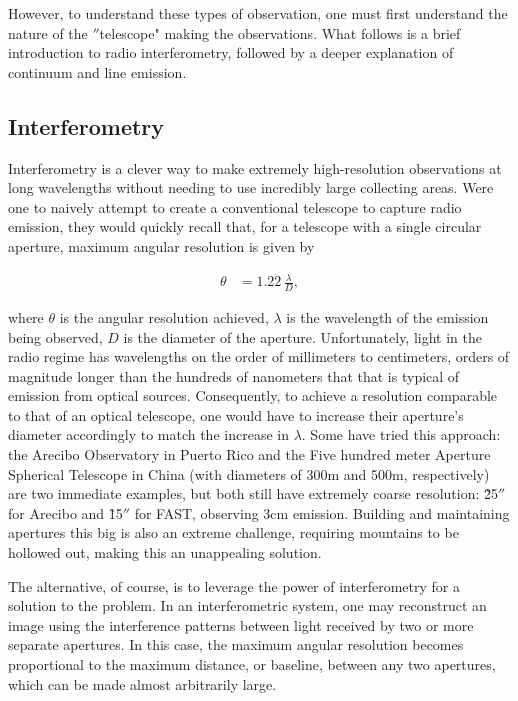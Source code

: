 However, to understand these types of observation, one must first understand the nature of the $''$telescope" making the observations. What follows is a brief introduction to radio interferometry, followed by a deeper explanation of continuum and line emission.



\subsection{Interferometry}
\label{section: interferometry}
Interferometry is a clever way to make extremely high-resolution observations at long wavelengths without needing to use incredibly large collecting areas. Were one to naively attempt to create a conventional telescope to capture radio emission, they would quickly recall that, for a telescope with a single circular aperture, maximum angular resolution is given by

\begin{align}
  \theta &= 1.22 \, \frac{\lambda}{D},
\end{align}

\noindent where $\theta$ is the angular resolution achieved, $\lambda$ is the wavelength of the emission being observed, $D$ is the diameter of the aperture. Unfortunately, light in the radio regime has wavelengths on the order of millimeters to centimeters, orders of magnitude longer than the hundreds of nanometers that that is typical of emission from optical sources. Consequently, to achieve a resolution comparable to that of an optical telescope, one would have to increase their aperture's diameter accordingly to match the increase in $\lambda$. Some have tried this approach: the Arecibo Observatory in Puerto Rico and the Five hundred meter Aperture Spherical Telescope in China (with diameters of 300m and 500m, respectively) are two immediate examples, but both still have extremely coarse resolution: \~25$''$ for Arecibo and \~15$''$ for FAST, observing 3cm emission. Building and maintaining apertures this big is also an extreme challenge, requiring mountains to be hollowed out, making this an unappealing solution.

The alternative, of course, is to leverage the power of interferometry for a solution to the problem. In an interferometric system, one may reconstruct an image using the interference patterns between light received by two or more separate apertures. In this case, the maximum angular resolution becomes proportional to the maximum distance, or baseline, between any two  apertures, which can be made almost arbitrarily large.

